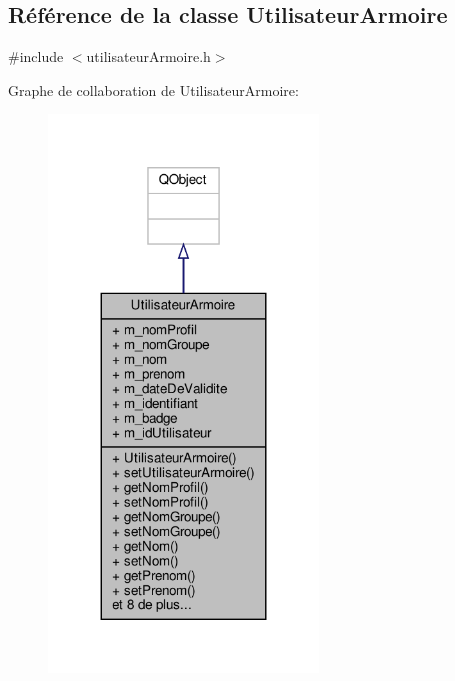 \hypertarget{class_utilisateur_armoire}{}\subsection{Référence de la classe Utilisateur\+Armoire}
\label{class_utilisateur_armoire}


{\ttfamily \#include $<$utilisateur\+Armoire.\+h$>$}



Graphe de collaboration de Utilisateur\+Armoire\+:\nopagebreak
\begin{figure}[H]
\begin{center}
\leavevmode
\includegraphics[width=203pt]{class_utilisateur_armoire__coll__graph}
\end{center}
\end{figure}
